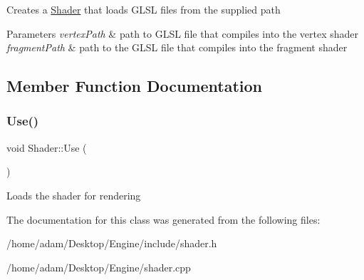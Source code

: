 Creates a \hyperlink{classShader}{Shader} that loads G\+L\+SL files from the supplied path 
\begin{DoxyParams}{Parameters}
{\em vertex\+Path} & path to G\+L\+SL file that compiles into the vertex shader \\
\hline
{\em fragment\+Path} & path to the G\+L\+SL file that compiles into the fragment shader \\
\hline
\end{DoxyParams}


\subsection{Member Function Documentation}
\mbox{\label{classShader_a6b11327cff651ffdb22988b6917b1650}} 
\subsubsection{\texorpdfstring{Use()}{Use()}}
{\footnotesize\ttfamily void Shader\+::\+Use (\begin{DoxyParamCaption}{ }\end{DoxyParamCaption})}

Loads the shader for rendering 

The documentation for this class was generated from the following files\+:\begin{DoxyCompactItemize}
\item 
/home/adam/\+Desktop/\+Engine/include/shader.\+h\item 
/home/adam/\+Desktop/\+Engine/shader.\+cpp\end{DoxyCompactItemize}
